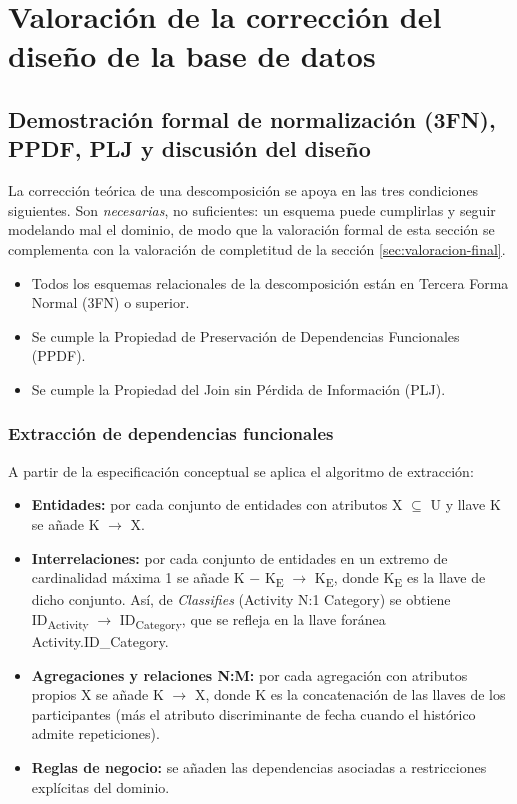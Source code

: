 \documentclass[11pt,a4paper]{article}
\begin{document}
\newpage
\section{Valoración de la corrección del diseño de la base de datos}
\subsection{Demostración formal de normalización (3FN), PPDF, PLJ y discusión del diseño}
La corrección teórica de una descomposición se apoya en las tres condiciones siguientes. Son \textit{necesarias}, no suficientes: un esquema puede cumplirlas y seguir modelando mal el dominio, de modo que la valoración formal de esta sección se complementa con la valoración de completitud de la sección \ref{sec:valoracion-final}.

\begin{itemize}[leftmargin=1.2em,itemsep=2pt,topsep=3pt]
\item Todos los esquemas relacionales de la descomposición están en Tercera Forma Normal (3FN) o superior.
\item Se cumple la Propiedad de Preservación de Dependencias Funcionales (PPDF).
\item Se cumple la Propiedad del Join sin Pérdida de Información (PLJ).
\end{itemize}
\subsubsection{Extracción de dependencias funcionales}\label{sec:extraccion}
A partir de la especificación conceptual se aplica el algoritmo de extracción:

\begin{itemize}[leftmargin=1.2em,itemsep=2pt,topsep=3pt]
\item \textbf{Entidades:} por cada conjunto de entidades con atributos X \ensuremath{\subseteq} U y llave K se añade K \ensuremath{\rightarrow} X.
\item \textbf{Interrelaciones:} por cada conjunto de entidades en un extremo de cardinalidad máxima 1 se añade K \ensuremath{-} K\textsubscript{E} \ensuremath{\rightarrow} K\textsubscript{E}, donde K\textsubscript{E} es la llave de dicho conjunto. Así, de \textit{Classifies} (Activity N:1 Category) se obtiene ID\textsubscript{Activity} \ensuremath{\rightarrow} ID\textsubscript{Category}, que se refleja en la llave foránea Activity.ID\_Category.
\item \textbf{Agregaciones y relaciones N:M:} por cada agregación con atributos propios X se añade K \ensuremath{\rightarrow} X, donde K es la concatenación de las llaves de los participantes (más el atributo discriminante de fecha cuando el histórico admite repeticiones).
\item \textbf{Reglas de negocio:} se añaden las dependencias asociadas a restricciones explícitas del dominio.
\end{itemize}
\end{document}
